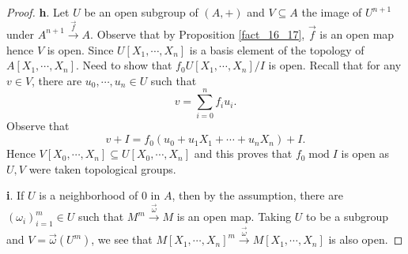 \documentclass[8pt]{article}
\numberwithin{equation}{section}
\DeclareMathOperator{\tmod}{mod}
\newcommand{\N}[0]{\mathbb{N}}
\begin{document}
\begin{proof}
    \par \textbf{h}. Let $U$ be an open subgroup of $(A,+)$ and $V\subseteq A$ the image of $U^{n+1}$ under $A^{n+1}\stackrel{\vec{f}}{\to}A$. Observe that by Proposition \ref{fact_16_17}, $\vec{f}$ is an open map hence $V$ is open.
    Since $U[X_1,\cdots,X_n]$ is a basis element of the topology of $A[X_1,\cdots,X_n]$. Need to show that $f_0U[X_1,\cdots,X_n]/I$ is open. Recall that for any $v\in V$, there are $u_0,\cdots,u_n\in U$ such that
    \begin{equation*}
    v = \sum_{i=0}^n f_iu_i.
    \end{equation*}
    Observe that 
    \begin{equation*}
    v + I = f_0(u_0+u_1X_1+\cdots+u_nX_n) + I.
    \end{equation*}
    Hence $V[X_0,\cdots,X_n]\subseteq U[X_0,\cdots,X_n]$ and this proves that $f_0\tmod{I}$ is open as $U,V$ were taken topological groups.%
   \par \textbf{i}. If $U$ is a neighborhood of $0$ in $A$, then by the assumption, there are $(\omega_i)_{i=1}^m\in U$ such that $M^m\stackrel{\vec{\omega}}{\to}M$ is an open map. Taking $U$ to be a subgroup and $V = \vec{\omega}(U^m)$, we see that $M[X_1,\cdots,X_n]^m\stackrel{\vec{\omega}}{\to}M[X_1,\cdots,X_n]$ is also open. %
\end{proof}
\end{document}

